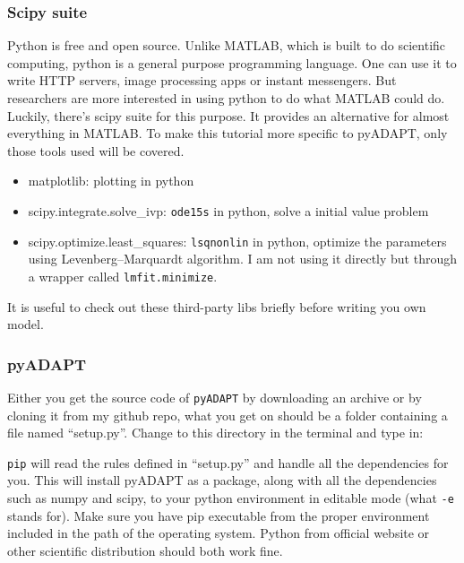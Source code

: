 \hypertarget{scipy-suite}{%
\subsubsection{Scipy suite}\label{scipy-suite}}

Python is free and open source. Unlike MATLAB, which is built to do
scientific computing, python is a general purpose programming language.
One can use it to write HTTP servers, image processing apps or instant
messengers. But researchers are more interested in using python to do
what MATLAB could do. Luckily, there's scipy suite for this purpose. It
provides an alternative for almost everything in MATLAB. To make this
tutorial more specific to pyADAPT, only those tools used will be
covered.

\begin{itemize}
\tightlist
\item
  matplotlib: plotting in python
\item
  scipy.integrate.solve\_ivp: \texttt{ode15s} in python, solve a initial
  value problem
\item
  scipy.optimize.least\_squares: \texttt{lsqnonlin} in python, optimize
  the parameters using Levenberg--Marquardt algorithm. I am not using it
  directly but through a wrapper called \texttt{lmfit.minimize}.
\end{itemize}

It is useful to check out these third-party libs briefly before writing
you own model.

\hypertarget{pyadapt}{%
\subsubsection{pyADAPT}\label{pyadapt}}

Either you get the source code of \texttt{pyADAPT} by downloading an
archive or by cloning it from my github repo, what you get on should be
a folder containing a file named ``setup.py''. Change to this directory
in the terminal and type in:

\begin{Shaded}
\begin{Highlighting}[]
\end{Highlighting}
\end{Shaded}

\texttt{pip} will read the rules defined in ``setup.py'' and handle all
the dependencies for you. This will install pyADAPT as a package, along
with all the dependencies such as numpy and scipy, to your python
environment in editable mode (what \texttt{-e} stands for). Make sure
you have pip executable from the proper environment included in the path
of the operating system. Python from official website or other
scientific distribution should both work fine.

